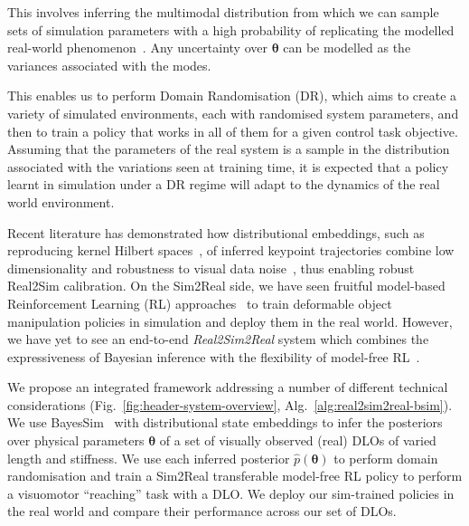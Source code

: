 This involves inferring the multimodal distribution from which we can sample sets of simulation parameters with a high probability of replicating the modelled real-world phenomenon~\cite{ramos2019bayessim}. Any uncertainty over $\boldsymbol{\theta}$ can be modelled as the variances associated with the modes.

This enables us to perform Domain Randomisation (DR), which aims to create a variety of simulated environments, each with randomised system parameters, and then to train a policy that works in all of them for a given control task objective. Assuming that the parameters of the real system is a sample in the distribution associated with the variations seen at training time, it is expected that a policy learnt in simulation under a DR regime will adapt to the dynamics of the real world environment.

Recent literature has demonstrated how distributional embeddings, such as reproducing kernel Hilbert spaces~\cite{muandet2017kernel}, of inferred keypoint trajectories combine low dimensionality and robustness to visual data noise~\cite{antonova2022bayesian}, thus enabling robust Real2Sim calibration. On the Sim2Real side, we have seen fruitful model-based Reinforcement Learning (RL) approaches~\cite{zeng2021transporter, seita2021learning} to train deformable object manipulation policies in simulation and deploy them in the real world. However, we have yet to see an end-to-end \emph{Real2Sim2Real} system which combines the expressiveness of Bayesian inference with the flexibility of model-free RL~\cite{schulman2017proximal}.

We propose an integrated framework addressing a number of different technical considerations (Fig.~\ref{fig:header-system-overview}, Alg.~\ref{alg:real2sim2real-bsim}). 
We use BayesSim~\cite{ramos2019bayessim} with distributional state embeddings to infer the posteriors over physical parameters $\boldsymbol{\theta}$ of a set of visually observed (real) DLOs of varied length and stiffness.
We use each inferred posterior $\hat{p}(\boldsymbol{\theta})$ to perform domain randomisation and train a Sim2Real transferable model-free RL policy to perform a visuomotor ``reaching'' task with a DLO. We deploy our sim-trained policies in the real world and compare their performance across our set of DLOs.

